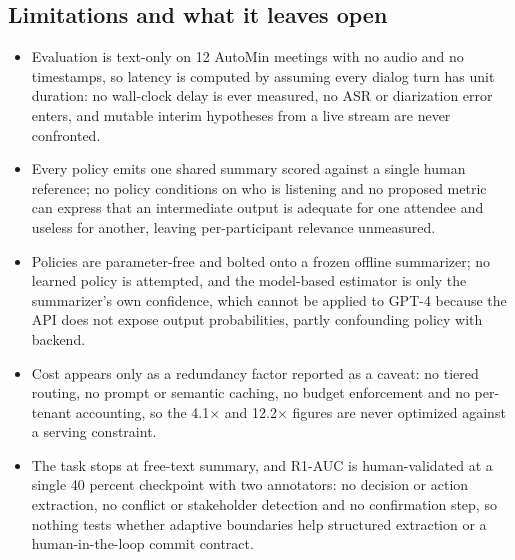 \subsection{Limitations and what it leaves open}
\begin{itemize}[leftmargin=*, itemsep=1pt, topsep=2pt]
  \item Evaluation is text-only on 12 AutoMin meetings with no audio and no timestamps, so latency is computed by assuming every dialog turn has unit duration: no wall-clock delay is ever measured, no ASR or diarization error enters, and mutable interim hypotheses from a live stream are never confronted.
  \item Every policy emits one shared summary scored against a single human reference; no policy conditions on who is listening and no proposed metric can express that an intermediate output is adequate for one attendee and useless for another, leaving per-participant relevance unmeasured.
  \item Policies are parameter-free and bolted onto a frozen offline summarizer; no learned policy is attempted, and the model-based estimator is only the summarizer's own confidence, which cannot be applied to GPT-4 because the API does not expose output probabilities, partly confounding policy with backend.
  \item Cost appears only as a redundancy factor reported as a caveat: no tiered routing, no prompt or semantic caching, no budget enforcement and no per-tenant accounting, so the 4.1$\times$ and 12.2$\times$ figures are never optimized against a serving constraint.
  \item The task stops at free-text summary, and R1-AUC is human-validated at a single 40 percent checkpoint with two annotators: no decision or action extraction, no conflict or stakeholder detection and no confirmation step, so nothing tests whether adaptive boundaries help structured extraction or a human-in-the-loop commit contract.
\end{itemize}
